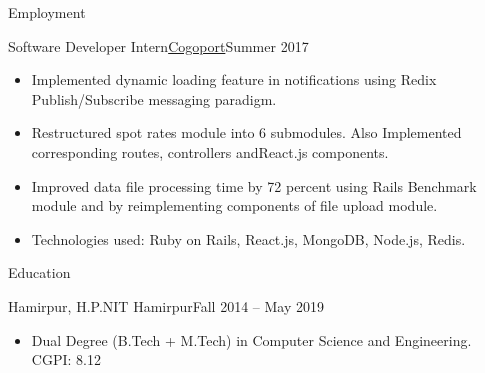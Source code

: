 \documentclass[]{mcdowellcv}
\begin{document}
	\makeheader
	
	\begin{cvsection}{Employment}
		\begin{cvsubsection}{Software Developer Intern}{\href {http://www.cogoport.com/}{Cogoport}}{Summer 2017}			
			\begin{itemize}
				\item Implemented dynamic loading feature in notifications using Redix Publish/Subscribe messaging paradigm.
				\item Restructured spot rates module into 6 submodules. Also Implemented corresponding routes, controllers and\newline React.js components.
				\item Improved data file processing time by 72 percent using Rails Benchmark module and by reimplementing components of file upload module.
				\item Technologies used: Ruby on Rails, React.js, MongoDB, Node.js, Redis.
			\end{itemize}
		\end{cvsubsection}
	\end{cvsection}
	
	\begin{cvsection}{Education}
		\begin{cvsubsection}{Hamirpur, H.P.}{NIT Hamirpur}{Fall 2014 -- May 2019}
			\begin{itemize}
				\item Dual Degree (B.Tech + M.Tech) in Computer Science and Engineering. CGPI: 8.12
			\end{itemize}
		\end{cvsubsection}
	\end{cvsection}
	
\end{document}
